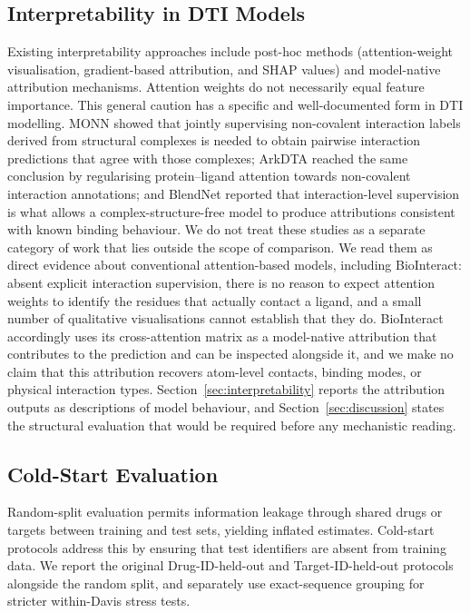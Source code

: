 \documentclass[fleqn,10pt]{wlscirep}
\begin{document}
\subsection{Interpretability in DTI Models}

Existing interpretability approaches include post-hoc methods (attention-weight
visualisation, gradient-based attribution, and SHAP values\cite{jimenez2020drug})
and model-native attribution mechanisms.  Attention weights do not necessarily
equal feature importance.\cite{jain2019attention}
\begingroup\color{red}
This general caution has a specific and well-documented form in DTI modelling.
MONN showed that jointly supervising non-covalent interaction labels derived
from structural complexes is needed to obtain pairwise interaction predictions
that agree with those complexes;\cite{li2020monn} ArkDTA reached the same
conclusion by regularising protein--ligand attention towards non-covalent
interaction annotations;\cite{gim2023arkdta} and BlendNet reported that
interaction-level supervision is what allows a complex-structure-free model to
produce attributions consistent with known binding
behaviour.\cite{seo2024blendnet}  We do not treat these studies as a separate
category of work that lies outside the scope of comparison.  We read them as
direct evidence about conventional attention-based models, including
BioInteract: absent explicit interaction supervision, there is no reason to
expect attention weights to identify the residues that actually contact a
ligand, and a small number of qualitative visualisations cannot establish that
they do.  BioInteract accordingly uses its cross-attention matrix as a
model-native attribution that contributes to the prediction and can be inspected
alongside it, and we make no claim that this attribution recovers atom-level
contacts, binding modes, or physical interaction types.  Section~\ref{sec:interpretability}
reports the attribution outputs as descriptions of model behaviour, and
Section~\ref{sec:discussion} states the structural evaluation that would be
required before any mechanistic reading.
\endgroup

\subsection{Cold-Start Evaluation}

Random-split evaluation permits information leakage through shared drugs or
targets between training and test sets, yielding inflated
estimates.\cite{huang2021therapeutics}  Cold-start protocols address this by
ensuring that test identifiers are absent from training data. We report the
original Drug-ID-held-out and Target-ID-held-out protocols alongside the random
split, and separately use exact-sequence grouping for stricter within-Davis
stress tests.
\end{document}
